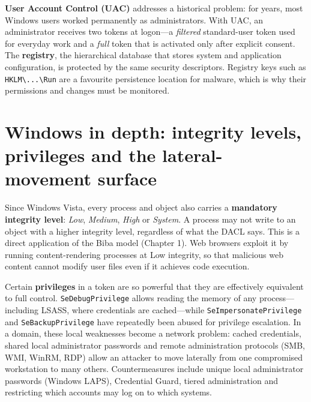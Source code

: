 \textbf{User Account Control (UAC)} addresses a historical problem: for years, most Windows users worked permanently as administrators. With UAC, an administrator receives two tokens at logon—a \emph{filtered} standard-user token used for everyday work and a \emph{full} token that is activated only after explicit consent. The \textbf{registry}, the hierarchical database that stores system and application configuration, is protected by the same security descriptors. Registry keys such as \texttt{HKLM\textbackslash{}...\textbackslash{}Run} are a favourite persistence location for malware, which is why their permissions and changes must be monitored.

\section{Windows in depth: integrity levels, privileges and the lateral-movement surface}\label{sec:2.5}
Since Windows Vista, every process and object also carries a \textbf{mandatory integrity level}: \emph{Low}, \emph{Medium}, \emph{High} or \emph{System}. A process may not write to an object with a higher integrity level, regardless of what the DACL says. This is a direct application of the Biba model (Chapter 1). Web browsers exploit it by running content-rendering processes at Low integrity, so that malicious web content cannot modify user files even if it achieves code execution.

Certain \textbf{privileges} in a token are so powerful that they are effectively equivalent to full control. \texttt{SeDebugPrivilege} allows reading the memory of any process—including LSASS, where credentials are cached—while \texttt{SeImpersonatePrivilege} and \texttt{SeBackupPrivilege} have repeatedly been abused for privilege escalation. In a domain, these local weaknesses become a network problem: cached credentials, shared local administrator passwords and remote administration protocols (SMB, WMI, WinRM, RDP) allow an attacker to move laterally from one compromised workstation to many others. Countermeasures include unique local administrator passwords (Windows LAPS), Credential Guard, tiered administration and restricting which accounts may log on to which systems.


